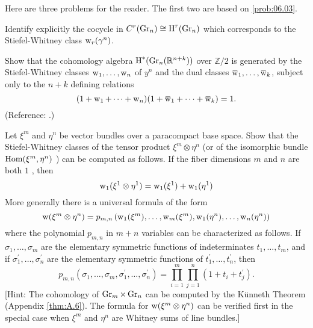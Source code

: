 \documentclass[../main]{subfiles}
\begin{document}
Here are three problems for the reader. The first two are based on \ref{prob:06.03}.

\begin{problem}
\label{prob:07.01}
Identify explicitly the cocycle in $C^{r}(\operatorname{Gr}_n) \cong \operatorname{H}^{r}(\operatorname{Gr}_n)$ which corresponds to the Stiefel-Whitney class $\operatorname{w}_{r}(\gamma^{n})$.
\end{problem}
\begin{problem}
\label{prob:07.02}
Show that the cohomology algebra $\operatorname{H}^{\ast}(\operatorname{Gr}_n(\mathbb R^{n+k}))$ over $\mathbb{Z} / 2$ is generated by the Stiefel-Whitney classes $\operatorname{w}_{1}, \dots, \operatorname{w}_{n}$ of $y^{n}$ and the dual classes $\xoverline{\sw}_{1}, \dots, \xoverline{\sw}_{k}$, subject only to the $n+k$ defining relations
\[(1+\sw_{1}+\dots+\sw_{n})(1+\xoverline{\sw}_{1}+\dots+\xoverline{\sw}_{k})=1.\]
(Reference: \cite[pp. 190]{Borel1953}.)
\end{problem}
\begin{problem}
\label{prob:07.03}
Let $\xi^{m}$ and $\eta^{n}$ be vector bundles over a paracompact base space. Show that the Stiefel-Whitney classes of the tensor product $\xi^{m} \otimes \eta^{n}$ (or of the isomorphic bundle $\operatorname{Hom}(\xi^{m}, \eta^{n})$ ) can be computed as follows. If the fiber dimensions $m$ and $n$ are both $ 1 $ , then
\[\operatorname{w}_{1}(\xi^{1} \otimes \eta^{1})=\operatorname{w}_{1}(\xi^{1})+\operatorname{w}_{1}(\eta^{1})\]
More generally there is a universal formula of the form
\[\operatorname{w}(\xi^{m} \otimes \eta^{n})=p_{m, n}\left(\operatorname{w}_{1}(\xi^{m}), \dots, \operatorname{w}_{m}(\xi^{m}), \operatorname{w}_{1}(\eta^{n}), \dots, \operatorname{w}_{n}(\eta^{n})\right)\]
where the polynomial $p_{m, n}$ in $m+n$ variables can be characterized as follows. If $\sigma_{1}, \dots, \sigma_{m}$ are the elementary symmetric functions of indeterminates $t_{1}, \dots, t_{m}$, and if $\sigma_{1}^{\prime}, \dots, \sigma_{n}^{\prime}$ are the elementary symmetric functions of $t_{1}^{\prime}, \dots, t_{n}^{\prime}$, then
\[p_{m, n}(\sigma_{1}, \dots, \sigma_{m}, \sigma_{1}^{\prime}, \dots, \sigma_{n}^{\prime})=\prod_{i=1}^{m} \prod_{j=1}^{n}(1+t_{i}+t_{j}^{\prime}).	\]
[Hint: The cohomology of $\operatorname{Gr}_m \times \operatorname{Gr}_n$ can be computed by the Künneth Theorem (Appendix \ref{thm:A.6}). The formula for $\operatorname{w}(\xi^{m} \otimes \eta^{n})$ can be verified first in the special case when $\xi^{m}$ and $\eta^{n}$ are Whitney sums of line bundles.]
\end{problem}
\end{document}
